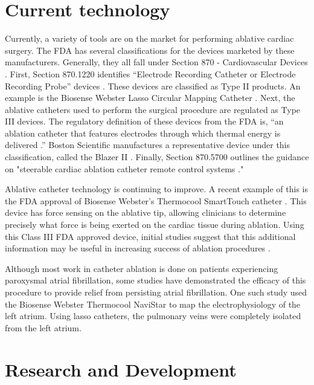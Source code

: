 \documentclass[letterpaper,10pt,conference]{ieeeconf}   %
\begin{document}
\section{Current technology}
\label{sec:currenttech}

Currently, a variety of tools are on the market for performing ablative cardiac surgery. The FDA has several classifications for the devices marketed by these manufacturers. Generally, they all fall under Section 870 - Cardiovascular Devices \cite{FDA:870}. First, Section 870.1220 identifies ``Electrode Recording Catheter or Electrode Recording Probe'' devices \cite{FDA:870.1220}. These devices are classified as Type II products. An example is the Biosense Webster Lasso Circular Mapping Catheter \cite{BiosenseWebster:Lasso2515}.  Next, the ablative catheters used to perform the surgical procedure are regulated as Type III devices. The regulatory definition of these devices from the FDA is, ``an ablation catheter that features electrodes through which thermal energy is delivered \cite{FDA:OAD}.'' Boston Scientific manufactures a representative device under this classification, called the Blazer II \cite{BostonScientific:BlazerII}. Finally, Section 870.5700 outlines the guidance on "steerable cardiac ablation catheter remote control systems \cite{FDA:870.5700}." 

Ablative catheter technology is continuing to improve. A recent example of this is the FDA approval of Biosense Webster's Thermocool SmartTouch catheter \cite{BioSenseWebster:FDAApproval}. This device has force sensing on the ablative tip, allowing clinicians to determine precisely what force is being exerted on the cardiac tissue during ablation. Using this Class III FDA approved device, initial studies suggest that this additional information may be useful in increasing success of ablation procedures \cite{natale:14a}.  

Although most work in catheter ablation is done on patients experiencing paroxysmal atrial fibrillation, some studies have demonstrated the efficacy of this procedure to provide relief from persisting atrial fibrillation. One such study \cite{ouyang:05a} used the Biosense Webster Thermocool NaviStar to map the electrophysiology of the left atrium. Using lasso catheters, the pulmonary veins were completely isolated from the left atrium. 

\section{Research and Development}
\label{sec:research}
\end{document}
